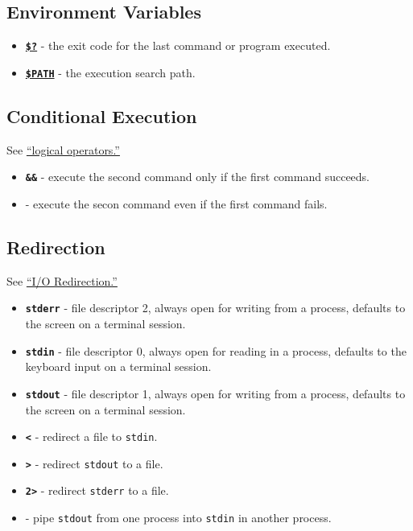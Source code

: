 \documentclass[10pt,]{book}
\numberwithin{figure}{chapter}
\begin{document}
\subsection{Environment Variables}\label{environment-variables}

\begin{itemize}
\item
  \href{http://linux.die.net/abs-guide/exit-status.html}{\textbf{\texttt{\$?}}}
  - the exit code for the last command or program executed.
\item
  \href{http://linux.die.net/Bash-Beginners-Guide/sect_03_02.html}{\textbf{\texttt{\$PATH}}}
  - the execution search path.
\end{itemize}

\subsection{Conditional Execution}\label{conditional-execution}

See \href{http://linux.die.net/abs-guide/ops.html}{``logical
operators.''}

\begin{itemize}
\item
  \textbf{\texttt{\&\&}} - execute the second command only if the first
  command succeeds.
\item
  \textbf{\texttt{\textbar{}\textbar{}}} - execute the secon command
  even if the first command fails.
\end{itemize}

\subsection{Redirection}\label{redirection}

See \href{http://linux.die.net/abs-guide/io-redirection.html}{``I/O
Redirection.''}

\begin{itemize}
\item
  \textbf{\texttt{stderr}} - file descriptor 2, always open for writing
  from a process, defaults to the screen on a terminal session.
\item
  \textbf{\texttt{stdin}} - file descriptor 0, always open for reading
  in a process, defaults to the keyboard input on a terminal session.
\item
  \textbf{\texttt{stdout}} - file descriptor 1, always open for writing
  from a process, defaults to the screen on a terminal session.
\item
  \textbf{\texttt{\textless{}}} - redirect a file to \texttt{stdin}.
\item
  \textbf{\texttt{\textgreater{}}} - redirect \texttt{stdout} to a file.
\item
  \textbf{\texttt{2\textgreater{}}} - redirect \texttt{stderr} to a
  file.
\item
  \textbf{\texttt{\textbar{}}} - pipe \texttt{stdout} from one process
  into \texttt{stdin} in another process.
\end{itemize}
\end{document}
